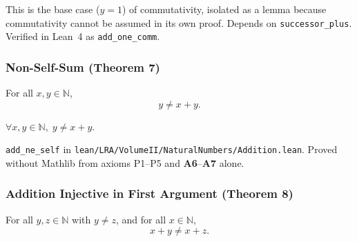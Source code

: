 \begin{remark*}
This is the base case ($y = 1$) of commutativity, isolated as a lemma
because commutativity cannot be assumed in its own proof.
Depends on \texttt{successor\_plus}.
Verified in Lean~4 as \texttt{add\_one\_comm}.
\end{remark*}

\subsubsection*{Non-Self-Sum (Theorem 7)}

\begin{theorem}
\label{thm:landau-add-ne-self}
For all $x, y \in \mathbb{N}$,
\[
  y \neq x + y.
\]
\end{theorem}

\begin{remark*}
$\forall x, y \in \mathbb{N},\; y \neq x + y$.
\end{remark*}

\begin{remark*}[Flash]
\end{remark*}

\begin{remark*}
\texttt{add\_ne\_self} in
\texttt{lean/LRA/VolumeII/NaturalNumbers/Addition.lean}.
Proved without Mathlib from axioms P1--P5 and \textbf{A6}--\textbf{A7} alone.
\end{remark*}


\subsubsection*{Addition Injective in First Argument (Theorem 8)}

\begin{theorem}
\label{thm:landau-thm8-add-injective}
For all $y, z \in \mathbb{N}$ with $y \neq z$, and for all $x \in \mathbb{N}$,
\[
  x + y \neq x + z.
\]
\end{theorem}

